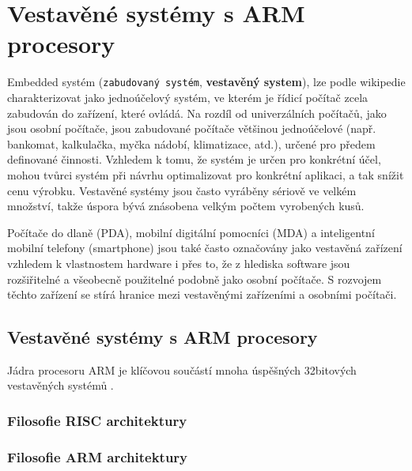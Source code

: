 \chapter{Vestavěné systémy s ARM procesory}\label{chap:ces_arm}
\minitoc
Embedded systém (\texttt{zabudovaný systém}, \textbf{vestavěný system}), lze podle wikipedie 
charakterizovat jako jednoúčelový systém, ve kterém je řídicí počítač zcela zabudován do zařízení, 
které ovládá. Na rozdíl od univerzálních počítačů, jako jsou osobní počítače, jsou zabudované 
počítače většinou jednoúčelové (např. bankomat, kalkulačka, myčka nádobí, klimatizace, atd.), 
určené pro předem definované činnosti. Vzhledem k tomu, že systém je určen pro konkrétní účel, 
mohou tvůrci systém při návrhu optimalizovat pro konkrétní aplikaci, a tak snížit cenu výrobku. 
Vestavěné systémy jsou často vyráběny sériově ve velkém množství, takže úspora bývá znásobena 
velkým počtem vyrobených kusů.

Počítače do dlaně (PDA), mobilní digitální pomocníci (MDA) a inteligentní mobilní telefony 
(smartphone) jsou také často označovány jako vestavěná zařízení vzhledem k vlastnostem hardware i 
přes to, že z hlediska software jsou rozšiřitelné a všeobecně použitelné podobně jako osobní 
počítače. S rozvojem těchto zařízení se stírá hranice mezi vestavěnými zařízeními a osobními 
počítači.

\section{Vestavěné systémy s ARM procesory}
  Jádra procesoru ARM je klíčovou součástí mnoha úspěšných 32bitových vestavěných systémů 
  \cite[s.~3]{sloss2004arm}.
  
  \subsection{Filosofie RISC architektury}
  
  \subsection{Filosofie ARM architektury}
